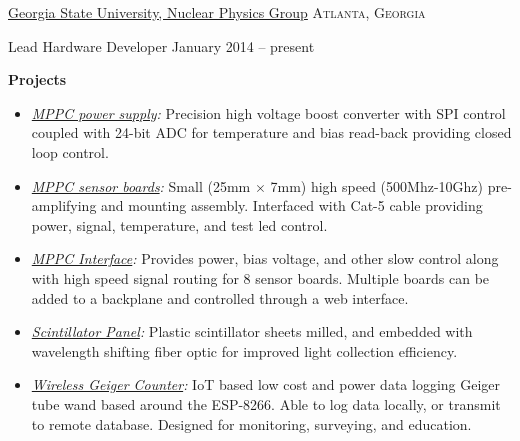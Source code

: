 \documentclass[10pt,letterpaper]{article}
\begin{document}
\headedsection  %
  {\href{http://phynp6.phy-astr.gsu.edu}{Georgia State University, Nuclear Physics Group}}
  {\textsc{Atlanta, Georgia}} {
  \headedsubsection
    {Lead Hardware Developer}
    {January 2014 -- present}
    {
    \textbf{Projects}
    \begin{itemize}
      \renewcommand\labelitemi{--}
      \item \emph{\href{https://github.com/Sawaiz/mppcHighVoltage}{MPPC power supply}:}
        Precision high voltage boost converter with SPI control coupled with 24-bit ADC for temperature and bias read-back providing closed loop control.
      \item \emph{\href{https://github.com/Sawaiz/mppcSensor}{MPPC sensor boards}:}
        Small (25mm $\times$ 7mm) high speed (500Mhz-10Ghz) pre-amplifying and mounting assembly. Interfaced with Cat-5 cable providing power, signal, temperature, and test led control.
      \item \emph{\href{https://github.com/Sawaiz/mppcInterface}{MPPC Interface}:}
        Provides power, bias voltage, and other slow control along with high speed signal routing for 8 sensor boards. Multiple boards can be added to a backplane and controlled through a web interface.
      \item \emph{\href{https://github.com/Sawaiz/scintillatorPanel}{Scintillator Panel}:}
        Plastic scintillator sheets milled, and embedded with wavelength shifting fiber optic for improved light collection efficiency.
      \item \emph{\href{https://github.com/Sawaiz/wirelessGeigerCounter}{Wireless Geiger Counter}:}
        IoT based low cost and power data logging Geiger tube wand based around the ESP-8266. Able to log data locally, or transmit to remote database. Designed for monitoring, surveying, and education.

\end{itemize}}}
\end{document}
